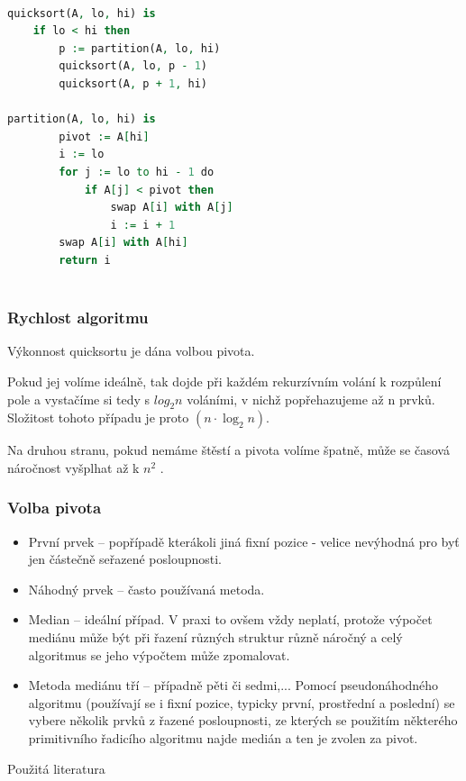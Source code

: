 \documentclass{beamer}
\begin{document}
\begin{frame}[fragile]
	\begin{lstlisting}[language=VHDL]
	
quicksort(A, lo, hi) is
    if lo < hi then
        p := partition(A, lo, hi)
        quicksort(A, lo, p - 1)
        quicksort(A, p + 1, hi)

partition(A, lo, hi) is
    	pivot := A[hi]
    	i := lo
    	for j := lo to hi - 1 do
        	if A[j] < pivot then
            	swap A[i] with A[j]
            	i := i + 1
    	swap A[i] with A[hi]
    	return i
       
	\end{lstlisting}
\end{frame}
\begin{frame}
	\frametitle{Rychlost algoritmu}
	Výkonnost quicksortu je dána volbou pivota. 
	
	Pokud jej volíme ideálně, tak dojde při každém rekurzívním volání k rozpůlení pole a 	vystačíme si tedy s $log_{2}{n}$ voláními, v nichž popřehazujeme až n prvků. 				Složitost tohoto případu je proto $(n \cdot \log_{2}{n})$.
	
	Na druhou stranu, pokud nemáme štěstí a pivota volíme špatně, může se časová náročnost vyšplhat až k $n^2$ \cite{popis}.
\end{frame}
\begin{frame}
	\frametitle{Volba pivota}
	\begin{itemize}
	 \item První prvek -- popřípadě kterákoli jiná fixní pozice - velice nevýhodná pro byť jen částečně seřazené posloupnosti.
	 \item Náhodný prvek -- často používaná metoda.
	 \item Median -- ideální případ. V praxi to ovšem vždy neplatí, protože výpočet mediánu může být při řazení různých struktur různě náročný a celý algoritmus se jeho výpočtem může zpomalovat. 
	 \item Metoda mediánu tří -- případně pěti či sedmi,... Pomocí pseudonáhodného algoritmu (používají se i fixní pozice, typicky první, prostřední a poslední) se vybere několik prvků z řazené posloupnosti, ze kterých se použitím některého primitivního řadicího algoritmu najde medián a ten je zvolen za pivot.\cite{cvut}
	\end{itemize}
\end{frame}
\begin{frame}
	\begin{center}
	\renewcommand{\refname}{Použitá literatura}
	\refname
	
	\end{center}
\end{frame}
\end{document}
